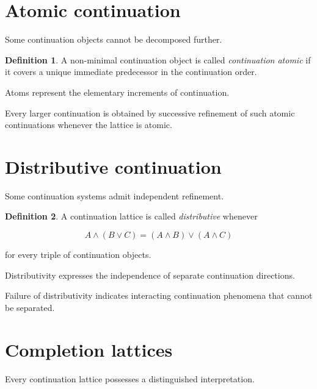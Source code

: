 \documentclass[13pt,openany]{book}
\theoremstyle{plain}
\theoremstyle{definition}
\newtheorem{definition}{Definition}[chapter]
\begin{document}
\section{Atomic continuation}

Some continuation objects cannot be decomposed further.

\begin{definition}
A non-minimal continuation object is called
\emph{continuation atomic}
if it covers a unique immediate predecessor in the continuation order.
\end{definition}

Atoms represent the elementary increments of continuation.

Every larger continuation is obtained by successive refinement of such atomic
continuations whenever the lattice is atomic.

\section{Distributive continuation}

Some continuation systems admit independent refinement.

\begin{definition}
A continuation lattice is called
\emph{distributive}
whenever

\[
A\wedge(B\vee C)
=
(A\wedge B)\vee(A\wedge C)
\]

for every triple of continuation objects.
\end{definition}

Distributivity expresses the independence of separate continuation directions.

Failure of distributivity indicates interacting continuation phenomena that
cannot be separated.

\section{Completion lattices}

Every continuation lattice possesses a distinguished interpretation.
\end{document}
